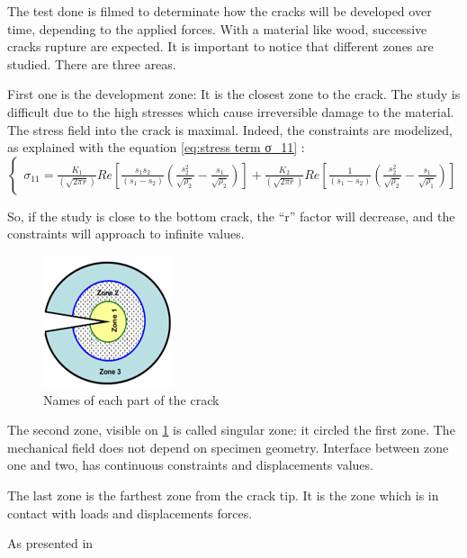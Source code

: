 The test done is filmed to determinate how the cracks will be developed over time, depending to the applied forces. With a material like wood, successive cracks rupture are expected. It is important to notice that different zones are studied. There are three areas. 

First one is the development zone: It is the closest zone to the crack. The study is difficult due to the high stresses which cause irreversible damage to the material. The stress field into the crack is maximal. Indeed, the constraints are modelized, as explained with the equation \ref{eq:stress term σ_11} :
\begin{equation}
	\left\{
	\begin{array}{rcr}
		\sigma_{11}=\frac{K_{1}}{(\sqrt{2 \pi r})}Re[\frac{s_{1}s_{2}}{(s_{1}-s_{2})}(\frac{s_{2}^{2}}{\sqrt{\rho_{2}}}-\frac{s_{1}}{\sqrt{\rho_{2}}})]+\frac{K_{2}}{(\sqrt{2 \pi r})}Re[\frac{1}{(s_{1}-s_{2})}(\frac{s_{2}^{2}}{\sqrt{\rho_{2}}}-\frac{s_{1}}{\sqrt{\rho_{1}}})]	
	\end{array}
	\right.
	\label{eq:stress term σ_11}
\end{equation} 

So, if the study is close to the bottom crack, the “r” factor will decrease, and the constraints will approach to infinite values.

\begin{figure}[th]
	\centering
	\includegraphics{Figures/Crack_zones}
	\decoRule
	\caption[Crack zones]{Names of each part of the crack}
	\label{fig:Fig4}
\end{figure}

The second zone, visible on \ref{fig:Fig4} is called singular zone: it circled the first zone. The mechanical field does not depend on specimen geometry. Interface between zone one and two, has continuous constraints and displacements values.

The last zone is the farthest zone from the crack tip. It is the zone which is in contact with loads and displacements forces.

As presented in \label{subsection}

